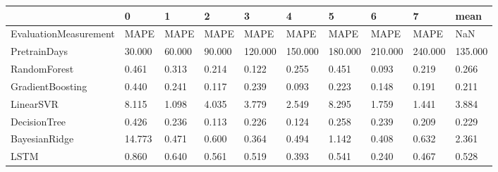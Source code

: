 \begin{tabular}{llllllllll}
\toprule
{} &      0 &      1 &      2 &       3 &       4 &       5 &       6 &       7 &    mean \\
\midrule
EvaluationMeasurement &   MAPE &   MAPE &   MAPE &    MAPE &    MAPE &    MAPE &    MAPE &    MAPE &     NaN \\
PretrainDays          & 30.000 & 60.000 & 90.000 & 120.000 & 150.000 & 180.000 & 210.000 & 240.000 & 135.000 \\
RandomForest          &  0.461 &  0.313 &  0.214 &   0.122 &   0.255 &   0.451 &   0.093 &   0.219 &   0.266 \\
GradientBoosting      &  0.440 &  0.241 &  0.117 &   0.239 &   0.093 &   0.223 &   0.148 &   0.191 &   0.211 \\
LinearSVR             &  8.115 &  1.098 &  4.035 &   3.779 &   2.549 &   8.295 &   1.759 &   1.441 &   3.884 \\
DecisionTree          &  0.426 &  0.236 &  0.113 &   0.226 &   0.124 &   0.258 &   0.239 &   0.209 &   0.229 \\
BayesianRidge         & 14.773 &  0.471 &  0.600 &   0.364 &   0.494 &   1.142 &   0.408 &   0.632 &   2.361 \\
LSTM                  &  0.860 &  0.640 &  0.561 &   0.519 &   0.393 &   0.541 &   0.240 &   0.467 &   0.528 \\
\bottomrule
\end{tabular}
